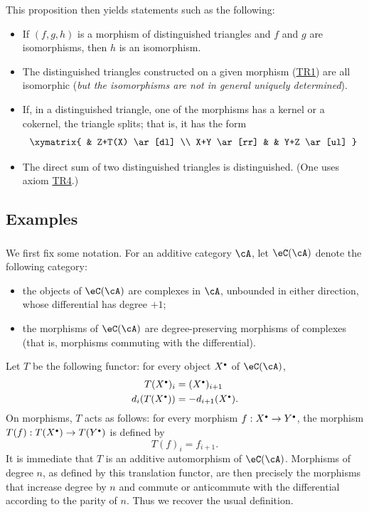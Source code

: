 \documentclass[12pt,oneside,english]{smfbook}
\let\oldbullet\bullet
\renewcommand{\bullet}{\textnormal{\tiny$\oldbullet$}}
\begin{document}
This proposition then yields statements such as the following:
\begin{itemize}
  \item If $(f,g,h)$ is a morphism of distinguished triangles and $f$ and $g$ are isomorphisms, then $h$ is an isomorphism.
  \item The distinguished triangles constructed on a given morphism (\hyperlink{VIII:TR1}{TR1}) are all isomorphic (\emph{but the isomorphisms are not in general uniquely determined}).
  \item If, in a distinguished triangle, one of the morphisms has a kernel or a cokernel, the triangle splits; that is, it has the form
    \[\xymatrix{
      & Z+T(X) \ar[dl] \\
      X+Y \ar[rr]
        & & Y+Z \ar[ul]
    }\]
  \item The direct sum of two distinguished triangles is distinguished. (One uses axiom \hyperlink{VIII:TR4}{TR4}.)
\end{itemize}

\subsection{Examples}\label{VIII:1-2}

\subsubsection{}\label{VIII:1-2-1}

We first fix some notation. For an additive category $\cA$, let $\eC(\cA)$ denote the following category:
\begin{itemize}
  \item the objects of $\eC(\cA)$ are complexes in $\cA$, unbounded in either direction, whose differential has degree $+1$;
  \item the morphisms of $\eC(\cA)$ are degree-preserving morphisms of complexes (that is, morphisms commuting with the differential).
\end{itemize}

Let $T$ be the following functor: for every object $X^\bullet$ of $\eC(\cA)$,
\begin{align*}
  T(X^\bullet)_i &= (X^\bullet)_{i+1} \\
  d_i(T(X^\bullet)) &= -d_{i+1}(X^\bullet)  \text{.}
\end{align*}
On morphisms, $T$ acts as follows: for every morphism $f:X^\bullet\to Y^\bullet$, the morphism $T(f):T(X^\bullet)\to T(Y^\bullet)$ is defined by
\[
  T(f)_i = f_{i+1} \text{.}
\]
It is immediate that $T$ is an additive automorphism of $\eC(\cA)$. Morphisms of degree $n$, as defined by this translation functor, are then precisely the morphisms that increase degree by $n$ and commute or anticommute with the differential according to the parity of $n$. Thus we recover the usual definition.
\end{document}
